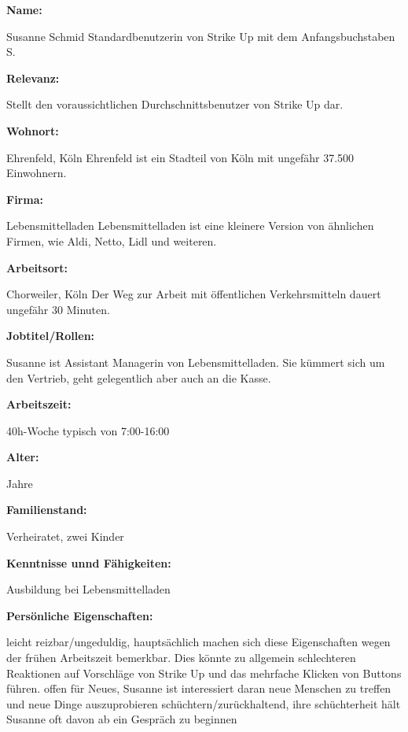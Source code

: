 \textbf{Name:}
\par
\begingroup
\leftskip=30pt
\noindent
Susanne Schmid \newline
Standardbenutzerin von Strike Up mit dem Anfangsbuchstaben S.
\par
\endgroup
\textbf{Relevanz:}
\par
\begingroup
\leftskip=30pt
\noindent
Stellt den voraussichtlichen Durchschnittsbenutzer von Strike Up dar.
\par
\endgroup
\textbf{Wohnort:}
\par
\begingroup
\leftskip=30pt
\noindent
Ehrenfeld, Köln \newline
Ehrenfeld ist ein Stadteil von Köln mit ungefähr 37.500 Einwohnern.
\par
\endgroup
\textbf{Firma:}
\par
\begingroup
\leftskip=30pt
\noindent
Lebensmittelladen \newline
Lebensmittelladen ist eine kleinere Version von ähnlichen Firmen, wie Aldi, Netto, Lidl und weiteren.
\par
\endgroup
\textbf{Arbeitsort:}
\par
\begingroup
\leftskip=30pt
\noindent
Chorweiler, Köln \newline
Der Weg zur Arbeit mit öffentlichen Verkehrsmitteln dauert ungefähr 30 Minuten.
\par
\endgroup
\textbf{Jobtitel/Rollen:}
\par
\begingroup
\leftskip=30pt
\noindent
Susanne ist Assistant Managerin von Lebensmittelladen. Sie kümmert sich um den Vertrieb, geht gelegentlich aber auch an die Kasse.
\par
\endgroup
\textbf{Arbeitszeit:}
\par
\begingroup
\leftskip=30pt
\noindent
40h-Woche typisch von 7:00-16:00
\par
\endgroup
\textbf{Alter:}
\par
\begingroup
\leftskip=30pt
 Jahre
\par
\endgroup
\textbf{Familienstand:}
\par
\begingroup
\leftskip=30pt
\noindent
Verheiratet, zwei Kinder
\par
\endgroup
\textbf{Kenntnisse unnd Fähigkeiten:}
\par
\begingroup
\leftskip=30pt
\noindent
Ausbildung bei Lebensmittelladen
\par
\endgroup
\textbf{Persönliche Eigenschaften:}
\par
\begingroup
\leftskip=30pt
\noindent
leicht reizbar/ungeduldig, hauptsächlich machen sich diese Eigenschaften wegen der frühen Arbeitszeit bemerkbar. Dies könnte zu allgemein schlechteren Reaktionen auf Vorschläge von Strike Up und das mehrfache Klicken von Buttons führen. \newline
offen für Neues, Susanne ist interessiert daran neue Menschen zu treffen und neue Dinge auszuprobieren \newline
schüchtern/zurückhaltend, ihre schüchterheit hält Susanne oft davon ab ein Gespräch zu beginnen
\par
\endgroup

